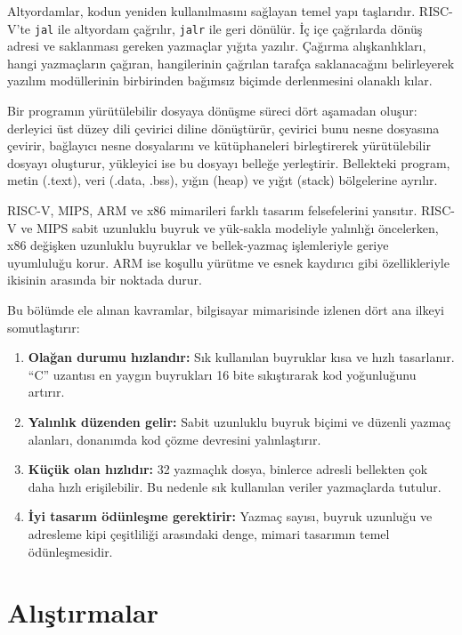 Altyordamlar, kodun yeniden kullanılmasını sağlayan temel yapı taşlarıdır. RISC-V'te \texttt{jal} ile altyordam çağrılır, \texttt{jalr} ile geri dönülür. İç içe çağrılarda dönüş adresi ve saklanması gereken yazmaçlar yığıta yazılır. Çağırma alışkanlıkları, hangi yazmaçların çağıran, hangilerinin çağrılan tarafça saklanacağını belirleyerek yazılım modüllerinin birbirinden bağımsız biçimde derlenmesini olanaklı kılar.

Bir programın yürütülebilir dosyaya dönüşme süreci dört aşamadan oluşur: derleyici üst düzey dili çevirici diline dönüştürür, çevirici bunu nesne dosyasına çevirir, bağlayıcı nesne dosyalarını ve kütüphaneleri birleştirerek yürütülebilir dosyayı oluşturur, yükleyici ise bu dosyayı belleğe yerleştirir. Bellekteki program, metin (.text), veri (.data, .bss), yığın (heap) ve yığıt (stack) bölgelerine ayrılır.

RISC-V, MIPS, ARM ve x86 mimarileri farklı tasarım felsefelerini yansıtır. RISC-V ve MIPS sabit uzunluklu buyruk ve yük-sakla modeliyle yalınlığı öncelerken, x86 değişken uzunluklu buyruklar ve bellek-yazmaç işlemleriyle geriye uyumluluğu korur. ARM ise koşullu yürütme ve esnek kaydırıcı gibi özellikleriyle ikisinin arasında bir noktada durur.

Bu bölümde ele alınan kavramlar, bilgisayar mimarisinde izlenen dört ana ilkeyi somutlaştırır:
\begin{sloppypar}
\begin{enumerate}
\item \textbf{Olağan durumu hızlandır:} Sık kullanılan buyruklar kısa ve hızlı tasarlanır. ``C'' uzantısı en yaygın buyrukları 16 bite sıkıştırarak kod yoğunluğunu artırır.
\item \textbf{Yalınlık düzenden gelir:} Sabit uzunluklu buyruk biçimi ve düzenli yazmaç alanları, donanımda kod çözme devresini yalınlaştırır.
\item \textbf{Küçük olan hızlıdır:} 32 yazmaçlık dosya, binlerce adresli bellekten çok daha hızlı erişilebilir. Bu nedenle sık kullanılan veriler yazmaçlarda tutulur.
\item \textbf{İyi tasarım ödünleşme gerektirir:} Yazmaç sayısı, buyruk uzunluğu ve adresleme kipi çeşitliliği arasındaki denge, mimari tasarımın temel ödünleşmesidir.
\end{enumerate}

\end{sloppypar}

\section*{Alıştırmalar}

